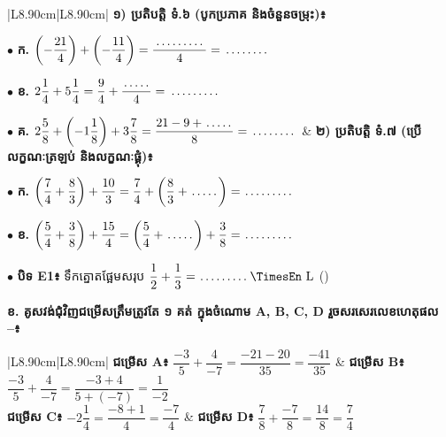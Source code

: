 \documentclass[a4paper,10pt]{article}
\newcommand{\en}[1]{{\TimesEn #1}}
\newcommand{\unit}[1]{\,\text{\en{#1}}}
\newcommand{\cnum}[1]{\mbox{\fontsize{10pt}{12pt}\selectfont\ding{\numexpr181+#1\relax}}}
\newcommand{\blank}[1][1.5cm]{\makebox[#1]{\dotfill}}
\begin{document}
{\renewcommand{\arraystretch}{1.48}
\begin{tabular}{|L{8.90cm}|L{8.90cm}|}
  \hline
  \textbf{១) ប្រតិបត្តិ ទំ.៦ (បូកប្រភាគ និងចំនួនចម្រុះ)៖}\par\vspace{2.5pt}
  $\bullet$ \textbf{ក.} $\left(-\dfrac{21}{4}\right) + \left(-\dfrac{11}{4}\right) = \dfrac{\blank[1.5cm]}{4} = \blank[1.3cm]$\par\vspace{3pt}
  $\bullet$ \textbf{ខ.} $2\dfrac{1}{4} + 5\dfrac{1}{4} = \dfrac{9}{4} + \dfrac{\blank[0.8cm]}{4} = \blank[1.5cm]$\par\vspace{3pt}
  $\bullet$ \textbf{គ.} $2\dfrac{5}{8} + \left(-1\dfrac{1}{8}\right) + 3\dfrac{7}{8} = \dfrac{21 - 9 + \blank[0.8cm]}{8} = \blank[1.3cm]$
  &
  \textbf{២) ប្រតិបត្តិ ទំ.៧ (ប្រើលក្ខណៈត្រឡប់ និងលក្ខណៈផ្គុំ)៖}\par\vspace{2.5pt}
  $\bullet$ \textbf{ក.} $\left(\dfrac{7}{4} + \dfrac{8}{3}\right) + \dfrac{10}{3} = \dfrac{7}{4} + \left(\dfrac{8}{3} + \blank[0.8cm]\right) = \blank[1.4cm]$\par\vspace{3pt}
  $\bullet$ \textbf{ខ.} $\left(\dfrac{5}{4} + \dfrac{3}{8}\right) + \dfrac{15}{4} = \left(\dfrac{5}{4} + \blank[0.8cm]\right) + \dfrac{3}{8} = \blank[1.4cm]$\par\vspace{3pt}
  $\bullet$ \textbf{បិទ \en{E1}៖} ទឹកត្នោតផ្អែមសរុប $\dfrac{1}{2}+\dfrac{1}{3} = \blank[1.4cm]\unit{L}$ (\cnum{1}) \\
  \hline
\end{tabular}}

\vspace{5pt}
\textbf{ខ. គូសវង់ជុំវិញជម្រើសត្រឹមត្រូវតែ ១ គត់ ក្នុងចំណោម \en{A, B, C, D} រួចសរសេរលេខហេតុផល \cnum{1}--\cnum{5}៖}

{\renewcommand{\arraystretch}{1.44}
\begin{tabular}{|L{8.90cm}|L{8.90cm}|}
  \hline
  \textbf{ជម្រើស \en{A}៖} $\dfrac{-3}{5} + \dfrac{4}{-7} = \dfrac{-21 - 20}{35} = \dfrac{-41}{35}$ &
  \textbf{ជម្រើស \en{B}៖} $\dfrac{-3}{5} + \dfrac{4}{-7} = \dfrac{-3 + 4}{5 + (-7)} = \dfrac{1}{-2}$ \\
  \hline
  \textbf{ជម្រើស \en{C}៖} $-2\dfrac{1}{4} = \dfrac{-8 + 1}{4} = \dfrac{-7}{4}$ &
  \textbf{ជម្រើស \en{D}៖} $\dfrac{7}{8} + \dfrac{-7}{8} = \dfrac{14}{8} = \dfrac{7}{4}$ \\
  \hline
\end{tabular}}
\end{document}
